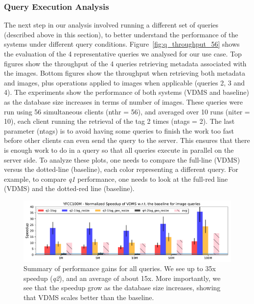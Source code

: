 


\subsubsection{Query Execution Analysis}

The next step in our analysis involved running a different set of queries
(described above in this section),
to better understand the performance of the systems under different query conditions.
Figure~\ref{fig:q_throughput_56} shows the evaluation of the 4 representative
queries we analysed for our use case.
Top figures show the throughput of the 4 queries
retrieving metadata associated with the images.
Bottom figures show the throughput when retrieving both metadata and images,
plus operations applied to images when applicable  (queries 2, 3 and 4).
The experiments show the performance of both systems (VDMS and baseline) as the
database size increases in terms of number of images.
These queries were run using 56 simultaneous clients (nthr = 56),
and averaged over 10 runs (niter = 10),
each client running the retrieval of the tag 2 times (ntags = 2).
The last parameter (ntags) is to avoid having some queries to finish the work
too fast before other clients can even send the query to the server.
This ensures that there is enough work to do in a query so that
all queries execute in parallel on the server side.
To analyze these plots, one needs to compare the full-line (VDMS) versus the
dotted-line (baseline), each color representing a different query.
For example, to compare \textit{q1} performance, one needs to look at
the full-red line (VDMS) and the dotted-red line (baseline).

\begin{figure}[ht!]
\centering
\includegraphics[width=\textwidth]{figures/summary_images}
\caption{Summary of performance gains for all queries.
We see up to 35x speedup (\textit{q2}), and an average of about 15x.
More importantly, we see that the speedup grow as the database size increases,
showing that VDMS scales better than the baseline.}
\label{fig:summary_images}
\end{figure}

